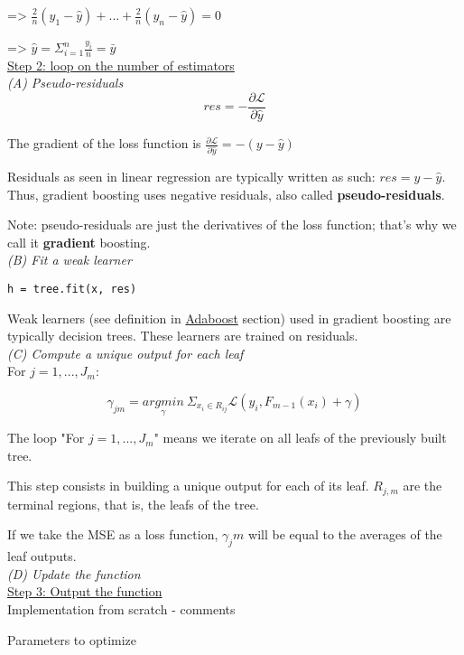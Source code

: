 => $\frac{2}{n}(y_1 - \hat y) + ... + \frac{2}{n}(y_n - \hat y) = 0$

=> $\hat y = \Sigma_{i=1}^n \frac{y_i}{n} = \bar y$ \\

\underline{Step 2: loop on the number of estimators} \\

\textit{(A) Pseudo-residuals} \\

$$res = - \frac{\partial \mathcal{L}}{\partial \hat y}$$

The gradient of the loss function is $\frac{\partial \mathcal{L}}{\partial \hat y} = -(y - \hat y)$

Residuals as seen in linear regression are typically written as such: $res = y - \hat y$. Thus, gradient boosting uses negative residuals, also called \textbf{pseudo-residuals}. 

Note: pseudo-residuals are just the derivatives of the loss function; that's why we call it \textbf{gradient} boosting. \\

\textit{(B) Fit a weak learner} \\

\lstset{language=Python}
\lstset{frame=lines}
\lstset{basicstyle=\footnotesize}
\begin{lstlisting}
h = tree.fit(x, res)
\end{lstlisting}

Weak learners (see definition in \hyperref[sec:adaboost]{Adaboost} section) used in gradient boosting are typically decision trees. These learners are trained on residuals. \\

\textit{(C) Compute a unique output for each leaf} \\

For $j=1,...,J_m$:

$$\gamma_{jm} = \underset{\gamma}{argmin}~\Sigma_{x_i \in R_{ij}} \mathcal{L}(y_i, F_{m-1}(x_i)+\gamma)$$

The loop "For $j=1,...,J_m$" means we iterate on all leafs of the previously built tree.

This step consists in building a unique output for each of its leaf. $R_{j,m}$ are the terminal regions, that is, the leafs of the tree.

If we take the MSE as a loss function, $\gamma_jm$ will be equal to the averages of the leaf outputs. \\

\textit{(D) Update the function} \\

\underline{Step 3: Output the function} \\


Implementation from scratch - comments

Parameters to optimize

\vspace{5mm}